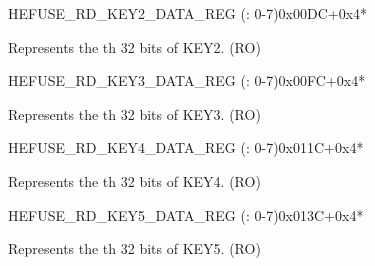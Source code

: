 \begin{register}{H}{EFUSE\_RD\_KEY2\_DATA\_REG (: 0-7)}{0x00DC+0x4*}\label{regdesc:EFUSERDKEY2DATANREG}
%
\regnewline%
\begin{regdesc}\begin{reglist}
\label{fielddesc:EFUSEKEY2DATAN}\item [EFUSE\_KEY2\_DATA\regindex{n}] Represents the th 32 bits of KEY2. (RO)
\end{reglist}\end{regdesc}
\end{register}


\begin{register}{H}{EFUSE\_RD\_KEY3\_DATA\_REG (: 0-7)}{0x00FC+0x4*}\label{regdesc:EFUSERDKEY3DATAMREG}
%
\regnewline%
\begin{regdesc}\begin{reglist}
\label{fielddesc:EFUSEKEY3DATAM}\item [EFUSE\_KEY3\_DATA\regindex{m}] Represents the th 32 bits of KEY3. (RO)
\end{reglist}\end{regdesc}
\end{register}


\begin{register}{H}{EFUSE\_RD\_KEY4\_DATA\_REG (: 0-7)}{0x011C+0x4*}\label{regdesc:EFUSERDKEY4DATANREG}
%
\regnewline%
\begin{regdesc}\begin{reglist}
\label{fielddesc:EFUSEKEY4DATAN}\item [EFUSE\_KEY4\_DATA\regindex{n}] Represents the th 32 bits of KEY4. (RO)
\end{reglist}\end{regdesc}
\end{register}


\begin{register}{H}{EFUSE\_RD\_KEY5\_DATA\_REG (: 0-7)}{0x013C+0x4*}\label{regdesc:EFUSERDKEY5DATAMREG}
%
\regnewline%
\begin{regdesc}\begin{reglist}
\label{fielddesc:EFUSEKEY5DATAM}\item [EFUSE\_KEY5\_DATA\regindex{m}] Represents the th 32 bits of KEY5. (RO)
\end{reglist}\end{regdesc}
\end{register}


